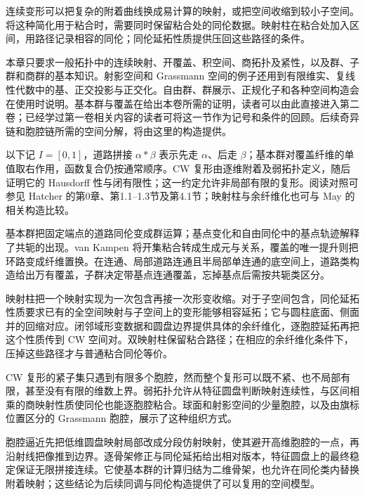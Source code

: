 \ProseParagraphBreak

连续变形可以把复杂的附着曲线换成易计算的映射，或把空间收缩到较小子空间。将这种简化用于粘合时，需要同时保留粘合处的同伦数据。映射柱在粘合处加入区间，用路径记录相容的同伦；同伦延拓性质提供压回这些路径的条件。

\ProseParagraphBreak

本章只要求一般拓扑中的连续映射、开覆盖、积空间、商拓扑及紧性，以及群、子群和商群的基本知识。射影空间和 Grassmann 空间的例子还用到有限维实、复线性代数中的基、正交投影与正交化。自由群、群展示、正规化子和各种空间构造会在使用时说明。基本群与覆盖在给出本卷所需的证明，读者可以由此直接进入第二卷；已经学过第一卷相关内容的读者可将这一节作为记号和条件的回顾。后续奇异链和胞腔链所需的空间分解，将由这里的构造提供。

\ProseParagraphBreak

以下记 \(I=[0,1]\)，道路拼接 \(\alpha*\beta\) 表示先走 \(\alpha\)、后走 \(\beta\)；基本群对覆盖纤维的单值取右作用，函数复合仍按通常顺序。CW 复形由逐维附着及弱拓扑定义，随后证明它的 Hausdorff 性与闭有限性；这一约定允许非局部有限的复形。阅读对照可参见 Hatcher 的第0章、第1.1--1.3节及第4.1节\cite[第0章; 第1.1--1.3节; 第4.1节]{Hatcher2002}；映射柱与余纤维化也可与 May 的相关构造比较\cite[第6章]{May1999}。






\begin{chaptersummary}
	基本群把固定端点的道路同伦变成群运算；基点变化和自由同伦中的基点轨迹解释了共轭的出现。van Kampen 将开集粘合转成生成元与关系，覆盖的唯一提升则把环路变成纤维置换。在连通、局部道路连通且半局部单连通的底空间上，道路类构造给出万有覆盖，子群决定带基点连通覆盖，忘掉基点后需按共轭类区分。

	\ProseParagraphBreak

	映射柱把一个映射实现为一次包含再接一次形变收缩。对于子空间包含，同伦延拓性质要求已有的全空间映射与子空间上的变形能够相容延拓；它与圆柱底面、侧面并的回缩对应。闭邻域形变数据和圆盘边界提供具体的余纤维化，逐胞腔延拓再把这个性质传到 CW 空间对。双映射柱保留粘合路径；在相应的余纤维化条件下，压掉这些路径才与普通粘合同伦等价。

	\ProseParagraphBreak

	CW 复形的紧子集只遇到有限多个胞腔，然而整个复形可以既不紧、也不局部有限，甚至没有有限的维数上界。弱拓扑允许从特征圆盘判断映射连续性，与区间相乘的商映射性质使同伦也能逐胞腔粘合。球面和射影空间的少量胞腔，以及由旗标位置区分的 Grassmann 胞腔，展示了这种组织方式。

	\ProseParagraphBreak

	胞腔逼近先把低维圆盘映射局部改成分段仿射映射，使其避开高维胞腔的一点，再沿射线把像推到边界。逐骨架修正与同伦延拓给出相对版本，特征圆盘上的最终稳定保证无限拼接连续。它使基本群的计算归结为二维骨架，也允许在同伦类内替换附着映射；这些结论为后续同调与同伦构造提供了可以复用的空间模型。
\end{chaptersummary}

